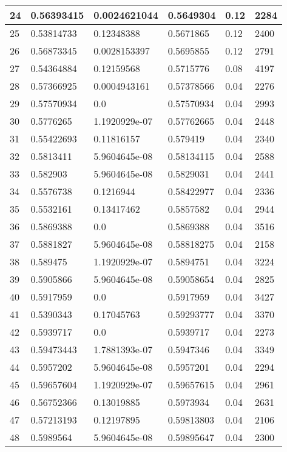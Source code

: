 \begin{longtable}{|l|l|l|l|l|l|}
24 & 0.56393415 & 0.0024621044 & 0.5649304 & 0.12 & 2284 \\ \hline 
25 & 0.53814733 & 0.12348388 & 0.5671865 & 0.12 & 2400 \\ \hline 
26 & 0.56873345 & 0.0028153397 & 0.5695855 & 0.12 & 2791 \\ \hline 
27 & 0.54364884 & 0.12159568 & 0.5715776 & 0.08 & 4197 \\ \hline 
28 & 0.57366925 & 0.0004943161 & 0.57378566 & 0.04 & 2276 \\ \hline 
29 & 0.57570934 & 0.0 & 0.57570934 & 0.04 & 2993 \\ \hline 
30 & 0.5776265 & 1.1920929e-07 & 0.57762665 & 0.04 & 2448 \\ \hline 
31 & 0.55422693 & 0.11816157 & 0.579419 & 0.04 & 2340 \\ \hline 
32 & 0.5813411 & 5.9604645e-08 & 0.58134115 & 0.04 & 2588 \\ \hline 
33 & 0.582903 & 5.9604645e-08 & 0.5829031 & 0.04 & 2441 \\ \hline 
34 & 0.5576738 & 0.1216944 & 0.58422977 & 0.04 & 2336 \\ \hline 
35 & 0.5532161 & 0.13417462 & 0.5857582 & 0.04 & 2944 \\ \hline 
36 & 0.5869388 & 0.0 & 0.5869388 & 0.04 & 3516 \\ \hline 
37 & 0.5881827 & 5.9604645e-08 & 0.58818275 & 0.04 & 2158 \\ \hline 
38 & 0.589475 & 1.1920929e-07 & 0.5894751 & 0.04 & 3224 \\ \hline 
39 & 0.5905866 & 5.9604645e-08 & 0.59058654 & 0.04 & 2825 \\ \hline 
40 & 0.5917959 & 0.0 & 0.5917959 & 0.04 & 3427 \\ \hline 
41 & 0.5390343 & 0.17045763 & 0.59293777 & 0.04 & 3370 \\ \hline 
42 & 0.5939717 & 0.0 & 0.5939717 & 0.04 & 2273 \\ \hline 
43 & 0.59473443 & 1.7881393e-07 & 0.5947346 & 0.04 & 3349 \\ \hline 
44 & 0.5957202 & 5.9604645e-08 & 0.5957201 & 0.04 & 2294 \\ \hline 
45 & 0.59657604 & 1.1920929e-07 & 0.59657615 & 0.04 & 2961 \\ \hline 
46 & 0.56752366 & 0.13019885 & 0.5973934 & 0.04 & 2631 \\ \hline 
47 & 0.57213193 & 0.12197895 & 0.59813803 & 0.04 & 2106 \\ \hline 
48 & 0.5989564 & 5.9604645e-08 & 0.59895647 & 0.04 & 2300 \\ \hline 

\end{longtable}
